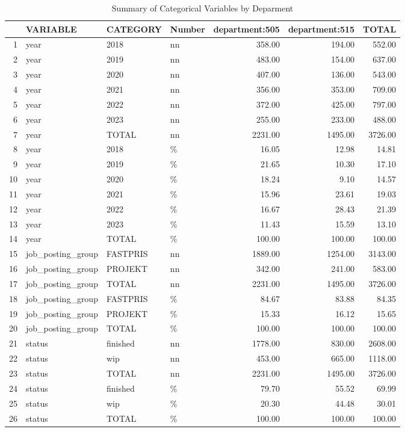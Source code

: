 \begin{sidewaystable}[ht]
\centering
\caption{Summary of Categorical Variables by Deparment} 
\begin{tabular}{rlllrrr}
  \hline
 & VARIABLE & CATEGORY & Number & department:505 & department:515 & TOTAL \\ 
  \hline
1 & year & 2018 & nn & 358.00 & 194.00 & 552.00 \\ 
  2 & year & 2019 & nn & 483.00 & 154.00 & 637.00 \\ 
  3 & year & 2020 & nn & 407.00 & 136.00 & 543.00 \\ 
  4 & year & 2021 & nn & 356.00 & 353.00 & 709.00 \\ 
  5 & year & 2022 & nn & 372.00 & 425.00 & 797.00 \\ 
  6 & year & 2023 & nn & 255.00 & 233.00 & 488.00 \\ 
  7 & year & TOTAL & nn & 2231.00 & 1495.00 & 3726.00 \\ 
  8 & year & 2018 & \% & 16.05 & 12.98 & 14.81 \\ 
  9 & year & 2019 & \% & 21.65 & 10.30 & 17.10 \\ 
  10 & year & 2020 & \% & 18.24 & 9.10 & 14.57 \\ 
  11 & year & 2021 & \% & 15.96 & 23.61 & 19.03 \\ 
  12 & year & 2022 & \% & 16.67 & 28.43 & 21.39 \\ 
  13 & year & 2023 & \% & 11.43 & 15.59 & 13.10 \\ 
  14 & year & TOTAL & \% & 100.00 & 100.00 & 100.00 \\ 
  15 & job\_posting\_group & FASTPRIS & nn & 1889.00 & 1254.00 & 3143.00 \\ 
  16 & job\_posting\_group & PROJEKT & nn & 342.00 & 241.00 & 583.00 \\ 
  17 & job\_posting\_group & TOTAL & nn & 2231.00 & 1495.00 & 3726.00 \\ 
  18 & job\_posting\_group & FASTPRIS & \% & 84.67 & 83.88 & 84.35 \\ 
  19 & job\_posting\_group & PROJEKT & \% & 15.33 & 16.12 & 15.65 \\ 
  20 & job\_posting\_group & TOTAL & \% & 100.00 & 100.00 & 100.00 \\ 
  21 & status & finished & nn & 1778.00 & 830.00 & 2608.00 \\ 
  22 & status & wip & nn & 453.00 & 665.00 & 1118.00 \\ 
  23 & status & TOTAL & nn & 2231.00 & 1495.00 & 3726.00 \\ 
  24 & status & finished & \% & 79.70 & 55.52 & 69.99 \\ 
  25 & status & wip & \% & 20.30 & 44.48 & 30.01 \\ 
  26 & status & TOTAL & \% & 100.00 & 100.00 & 100.00 \\ 
   \hline
\end{tabular}
\end{sidewaystable}

